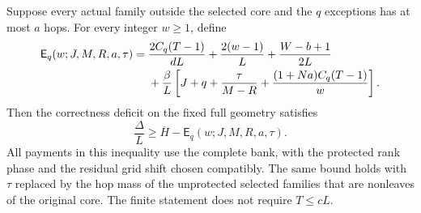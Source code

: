 \begin{theorem}\label{thm:paid-source-cover}
Suppose every actual family outside the selected core and the $q$
exceptions has at most $a$ hops. For every integer $w\ge1$, define
\begin{align}\label{eq:full-paid-error}
 \mathsf E_q(w;J,M,R,a,\tau)
 ={}&\frac{2C_q(T-1)}{dL}+\frac{2(w-1)}L+\frac{W-b+1}{2L}\notag\\
 &+\frac\beta L\left[J+q+\frac\tau{M-R}
                    +\frac{(1+Na)C_q(T-1)}w\right].
\end{align}
Then the correctness deficit on the fixed full geometry satisfies
\begin{equation}\label{eq:paid-source-cover}
 \frac\Delta L\ge\overline H-\mathsf E_q(w;J,M,R,a,\tau).
\end{equation}
All payments in this inequality use the complete bank, with the
protected rank phase and the residual grid shift chosen compatibly.
The same bound holds with $\tau$ replaced by the hop mass of the
unprotected selected families that are nonleaves of the original core.
The finite statement does not require $T\le cL$.
\end{theorem}
